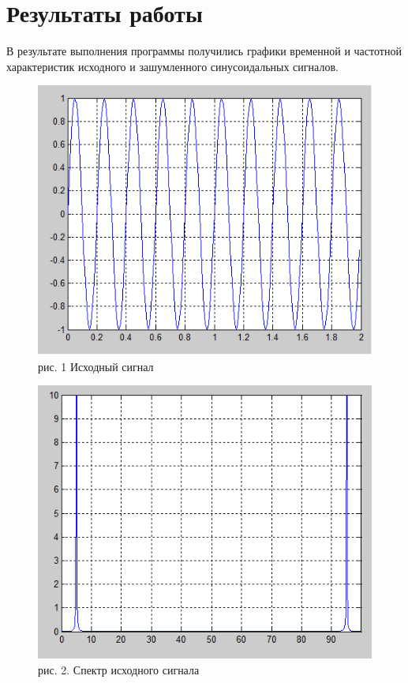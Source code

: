 \documentclass[10pt,a4paper]{report}
\begin{document}
\section{Результаты работы}
В результате выполнения программы получились графики временной и частотной характеристик исходного и зашумленного синусоидальных сигналов. \newpage
\begin{figure}
\begin{center}
\includegraphics[angle=0, scale = 0.9]{1.png}\newline
рис. 1 Исходный сигнал\newline
\end{center}
\begin{center}
\includegraphics[angle=0, scale = 0.9]{2.png}\newline
рис. 2. Спектр исходного сигнала\newline
\end{center}
\end{figure}
\end{document}
